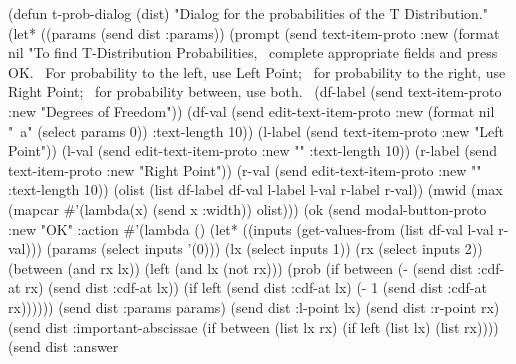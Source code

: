 \nwenddocs{}\plusendmoddef
(defun t-prob-dialog (dist)
  "Dialog for the probabilities of the T Distribution."
  (let* ((params (send dist :params))
         (prompt (send text-item-proto :new
                  (format nil 
                    "To find T-Distribution Probabilities,~%
                     complete appropriate fields and press OK.~%
                     For probability to the left, use Left Point;~%
                     for probability to the right, use Right Point;~%
                     for probability between, use both.~%
         (df-label (send text-item-proto :new "Degrees of Freedom"))
         (df-val (send edit-text-item-proto :new
                       (format nil "~a" (select params 0)) :text-length 10))
         (l-label (send text-item-proto :new "Left Point"))
         (l-val (send edit-text-item-proto :new "" :text-length 10))
         (r-label (send text-item-proto :new "Right Point"))
         (r-val (send edit-text-item-proto :new "" :text-length 10))
         (olist (list df-label df-val l-label l-val r-label r-val))
         (mwid (max (mapcar #'(lambda(x) (send x :width)) olist)))
         (ok (send modal-button-proto :new "OK"
                   :action
                   #'(lambda ()
                      (let* ((inputs (get-values-from 
                                      (list df-val l-val r-val)))
                             (params (select inputs '(0)))
                             (lx (select inputs 1))
                             (rx (select inputs 2))
                             (between (and rx lx))
                             (left (and lx (not rx)))
                             (prob (if between
                                      (- (send dist :cdf-at rx)
                                         (send dist :cdf-at lx))
                                     (if left
                                        (send dist :cdf-at lx)
                                       (- 1 (send dist :cdf-at rx))))))
                         (send dist :params params)
                         (send dist :l-point lx)
                         (send dist :r-point rx)
                         (send dist :important-abscissae
                               (if between
                                   (list lx rx)
                                 (if left
                                     (list lx)
                                   (list rx))))
                         (send dist :answer
